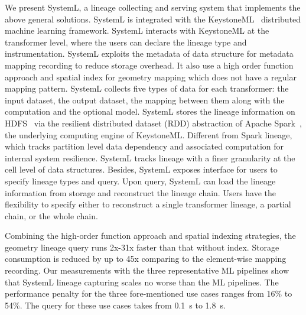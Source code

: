 \documentclass{sig-alternate}
\begin{document}

We present SystemL, a lineage collecting and serving system that implements the above general solutions.
SystemL is integrated with the KeystoneML~\cite{sparks15} distributed machine learning framework.
SystemL interacts with KeystoneML at the transformer level, where the users can declare the lineage type and instrumentation.
SystemL exploits the metadata of data structure for metadata mapping recording to reduce storage overhead.
It also use a high order function approach and spatial index for geometry mapping which does not have a regular mapping pattern.
SystemL collects five types of data for each transformer: the input dataset, the output dataset, the mapping between them
along with the computation and the optional model.
SystemL stores the lineage information on HDFS~\cite{shvachko10} via the resilient distributed dataset (RDD) abstraction
of Apache Spark~\cite{zaharia12}, the underlying computing engine of KeystoneML.
Different from Spark lineage, which tracks partition level data dependency and associated computation for internal system resilience.
SystemL tracks lineage with a finer granularity at the cell level of data structures.
Besides, SystemL exposes interface for users to specify lineage types and query.
Upon query, SystemL can load the lineage information from storage and reconstruct the lineage chain.
Users have the flexibility to specify either to reconstruct a single transformer lineage, a partial chain, or the whole chain.


Combining the high-order function approach and spatial indexing strategies, 
the geometry lineage query runs 2x-31x faster than that without index.
Storage consumption is reduced by up to 45x comparing to the element-wise mapping recording. 
Our measurements with the three representative ML pipelines show that SystemL lineage 
capturing scales no worse than the ML pipelines.
The performance penalty for the three fore-mentioned use cases ranges from 16\% to 54\%.
The query for these use cases takes from 0.1~s to 1.8~s. 
\end{document}

